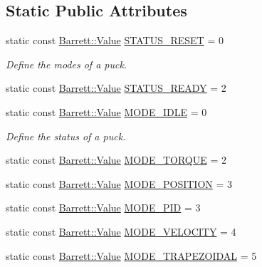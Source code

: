 \subsection*{Static Public Attributes}
\begin{DoxyCompactItemize}
\item 
static const \hyperlink{struct_barrett_a57ff132885344ca62e4b4b691885685b}{Barrett\+::\+Value} \hyperlink{classosa_puck_ada7927c208d1f07285d12074998bbf4c}{S\+T\+A\+T\+U\+S\+\_\+\+R\+E\+S\+E\+T} = 0
\begin{DoxyCompactList}\small\item\em Define the modes of a puck. \end{DoxyCompactList}\item 
static const \hyperlink{struct_barrett_a57ff132885344ca62e4b4b691885685b}{Barrett\+::\+Value} \hyperlink{classosa_puck_a0d02e251c5e3c54e0511cbb6d87dc619}{S\+T\+A\+T\+U\+S\+\_\+\+R\+E\+A\+D\+Y} = 2
\item 
static const \hyperlink{struct_barrett_a57ff132885344ca62e4b4b691885685b}{Barrett\+::\+Value} \hyperlink{classosa_puck_ad650adededab3406a2afb64c382b4b6b}{M\+O\+D\+E\+\_\+\+I\+D\+L\+E} = 0
\begin{DoxyCompactList}\small\item\em Define the status of a puck. \end{DoxyCompactList}\item 
static const \hyperlink{struct_barrett_a57ff132885344ca62e4b4b691885685b}{Barrett\+::\+Value} \hyperlink{classosa_puck_aabdc001b07826137272fb01ffb200aac}{M\+O\+D\+E\+\_\+\+T\+O\+R\+Q\+U\+E} = 2
\item 
static const \hyperlink{struct_barrett_a57ff132885344ca62e4b4b691885685b}{Barrett\+::\+Value} \hyperlink{classosa_puck_a7bbba0c7e8896c0d8b6da42f60d7ec0d}{M\+O\+D\+E\+\_\+\+P\+O\+S\+I\+T\+I\+O\+N} = 3
\item 
static const \hyperlink{struct_barrett_a57ff132885344ca62e4b4b691885685b}{Barrett\+::\+Value} \hyperlink{classosa_puck_a60ac2cf88c6c517f01db4569843a5e1a}{M\+O\+D\+E\+\_\+\+P\+I\+D} = 3
\item 
static const \hyperlink{struct_barrett_a57ff132885344ca62e4b4b691885685b}{Barrett\+::\+Value} \hyperlink{classosa_puck_a34b1e12b935b2890de3a86a5a8735733}{M\+O\+D\+E\+\_\+\+V\+E\+L\+O\+C\+I\+T\+Y} = 4
\item 
static const \hyperlink{struct_barrett_a57ff132885344ca62e4b4b691885685b}{Barrett\+::\+Value} \hyperlink{classosa_puck_ae59c70fb0ca441fbbce58a50539c7b36}{M\+O\+D\+E\+\_\+\+T\+R\+A\+P\+E\+Z\+O\+I\+D\+A\+L} = 5
\end{DoxyCompactItemize}


